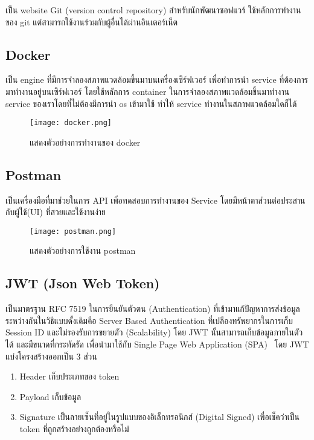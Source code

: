 เป็น website Git (version control repository) สำหรับนักพัฒนาซอฟแวร์ ใช้หลักการทำงานของ git แต่สามารถใช้งานร่วมกับผู้อื่นได้ผ่านอินเตอร์เน็ต

\subsection{Docker}

เป็น engine ที่มีการจำลองสภาพแวดล้อมขึ้นมาบนเครื่องเซิร์ฟเวอร์ เพื่อทำการนำ service ที่ต้องการมาทำงานอยู่บนเซิร์ฟเวอร์ โดยใช้หลักการ container ในการจำลองสภาพแวดล้อมขึ้นมาทำงาน service ของเราโดยที่ไม่ต้องมีการนำ os เข้ามาใช้ ทำให้ service ทำงานในสภาพแวดล้อมใดก็ได้~\cite{container}

\begin{figure}[H]
  \centering
  \texttt{[image: docker.png]}
  \caption{แสดงตัวอย่างการทำงานของ docker}
  \label{Fig:docker}
\end{figure}

\subsection{Postman}

เป็นเครื่องมือที่มาช่วยในการ API เพิ่อทดสอบการทำงานของ Service โดยมีหน้าตาส่วนต่อประสานกับผู้ใช้(UI) ที่สวยและใช้งานง่าย

\begin{figure}[H]
  \centering
  \texttt{[image: postman.png]}
  \caption{แสดงตัวอย่างการใช้งาน postman}
  \label{Fig:postman}
\end{figure}

\subsection{JWT (Json Web Token)}

เป็นมาตรฐาน RFC 7519 ในการยืนยันตัวตน (Authentication) ที่เข้ามาแก้ปัญหาการส่งข้อมูลระหว่างกันในวิธีแบบดั้งเดิมคือ Server Based Authentication ที่เปลืองทรัพยากรในการเก็บ Session ID และไม่รองรับการขยายตัว (Scalability)  โดย JWT นั้นสามารถเก็บข้อมูลภายในตัวได้ และมีขนาดที่กระทัดรัด เพื่อนำมาใช้กับ Single Page Web Application (SPA)~\cite{jwt} โดย JWT แบ่งโครงสร้างออกเป็น 3 ส่วน

\begin{enumerate}
  \item Header เก็บประเภทของ token
  \item Payload เก็บข้อมูล
  \item Signature เป็นลายเซ็นที่อยู่ในรูปแบบของอิเล็กทรอนิกส์ (Digital Signed) เพื่อเช็คว่าเป็น token ที่ถูกสร้างอย่างถูกต้องหรือไม่  
\end{enumerate}

